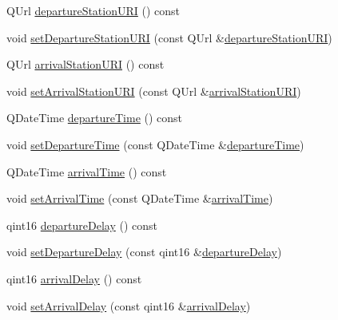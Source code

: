 \begin{DoxyCompactItemize}
\item 
Q\+Url \mbox{\hyperlink{classQRail_1_1Fragments_1_1Fragment_a5b64058868e96c5ca56b91405ca51683}{departure\+Station\+U\+RI}} () const
\item 
void \mbox{\hyperlink{classQRail_1_1Fragments_1_1Fragment_aeb4a5ba7ffc5cd4e632bc17edd53ae39}{set\+Departure\+Station\+U\+RI}} (const Q\+Url \&\mbox{\hyperlink{classQRail_1_1Fragments_1_1Fragment_a5b64058868e96c5ca56b91405ca51683}{departure\+Station\+U\+RI}})
\item 
Q\+Url \mbox{\hyperlink{classQRail_1_1Fragments_1_1Fragment_a196eaba03a9dd9751a011e30a1e37dd4}{arrival\+Station\+U\+RI}} () const
\item 
void \mbox{\hyperlink{classQRail_1_1Fragments_1_1Fragment_a067006f48ff9e2d7cf8178692333c510}{set\+Arrival\+Station\+U\+RI}} (const Q\+Url \&\mbox{\hyperlink{classQRail_1_1Fragments_1_1Fragment_a196eaba03a9dd9751a011e30a1e37dd4}{arrival\+Station\+U\+RI}})
\item 
Q\+Date\+Time \mbox{\hyperlink{classQRail_1_1Fragments_1_1Fragment_a95d2c99a166573817bd8d8aa8b688b5e}{departure\+Time}} () const
\item 
void \mbox{\hyperlink{classQRail_1_1Fragments_1_1Fragment_a971abc72093b4706f31b8c8f0c3e5b41}{set\+Departure\+Time}} (const Q\+Date\+Time \&\mbox{\hyperlink{classQRail_1_1Fragments_1_1Fragment_a95d2c99a166573817bd8d8aa8b688b5e}{departure\+Time}})
\item 
Q\+Date\+Time \mbox{\hyperlink{classQRail_1_1Fragments_1_1Fragment_ae8b17e8f7219d6252ffffcd4e20e7a35}{arrival\+Time}} () const
\item 
void \mbox{\hyperlink{classQRail_1_1Fragments_1_1Fragment_a414c20e8e0cb8cacdfc3cf2ab8e98f01}{set\+Arrival\+Time}} (const Q\+Date\+Time \&\mbox{\hyperlink{classQRail_1_1Fragments_1_1Fragment_ae8b17e8f7219d6252ffffcd4e20e7a35}{arrival\+Time}})
\item 
qint16 \mbox{\hyperlink{classQRail_1_1Fragments_1_1Fragment_aa0e43583b4d64c688f5fa7e9b13b0855}{departure\+Delay}} () const
\item 
void \mbox{\hyperlink{classQRail_1_1Fragments_1_1Fragment_a21cc925af677f647ce0e76b14532d2ac}{set\+Departure\+Delay}} (const qint16 \&\mbox{\hyperlink{classQRail_1_1Fragments_1_1Fragment_aa0e43583b4d64c688f5fa7e9b13b0855}{departure\+Delay}})
\item 
qint16 \mbox{\hyperlink{classQRail_1_1Fragments_1_1Fragment_a0f5ee06943c6cf1dc3ba0e98439e4262}{arrival\+Delay}} () const
\item 
void \mbox{\hyperlink{classQRail_1_1Fragments_1_1Fragment_a2ed5cbd8bc2ff93aea43396a7d9543a6}{set\+Arrival\+Delay}} (const qint16 \&\mbox{\hyperlink{classQRail_1_1Fragments_1_1Fragment_a0f5ee06943c6cf1dc3ba0e98439e4262}{arrival\+Delay}})

\end{DoxyCompactItemize}
